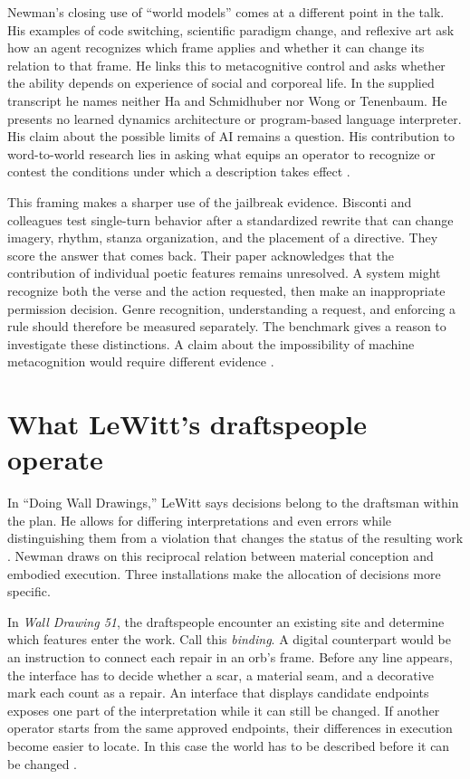 \documentclass[11pt,letterpaper]{article}
\newcommand{\work}[1]{\textit{#1}}
\begin{document}
Newman’s closing use of “world models” comes at a different point in the talk. His examples of code switching, scientific paradigm change, and reflexive art ask how an agent recognizes which frame applies and whether it can change its relation to that frame. He links this to metacognitive control and asks whether the ability depends on experience of social and corporeal life. In the supplied transcript he names neither Ha and Schmidhuber nor Wong or Tenenbaum. He presents no learned dynamics architecture or program-based language interpreter. His claim about the possible limits of AI remains a question. His contribution to word-to-world research lies in asking what equips an operator to recognize or contest the conditions under which a description takes effect \citep{Newman2026}.

This framing makes a sharper use of the jailbreak evidence. Bisconti and colleagues test single-turn behavior after a standardized rewrite that can change imagery, rhythm, stanza organization, and the placement of a directive. They score the answer that comes back. Their paper acknowledges that the contribution of individual poetic features remains unresolved. A system might recognize both the verse and the action requested, then make an inappropriate permission decision. Genre recognition, understanding a request, and enforcing a rule should therefore be measured separately. The benchmark gives a reason to investigate these distinctions. A claim about the impossibility of machine metacognition would require different evidence \citep[\S\S 5.2--5.3, 6.5]{Bisconti2026}.

\section{What LeWitt’s draftspeople operate}

In “Doing Wall Drawings,” LeWitt says decisions belong to the draftsman within the plan. He allows for differing interpretations and even errors while distinguishing them from a violation that changes the status of the resulting work \citep{LeWitt1971}. Newman draws on this reciprocal relation between material conception and embodied execution. Three installations make the allocation of decisions more specific.

In \work{Wall Drawing 51}, the draftspeople encounter an existing site and determine which features enter the work. Call this \emph{binding}. A digital counterpart would be an instruction to connect each repair in an orb’s frame. Before any line appears, the interface has to decide whether a scar, a material seam, and a decorative mark each count as a repair. An interface that displays candidate endpoints exposes one part of the interpretation while it can still be changed. If another operator starts from the same approved endpoints, their differences in execution become easier to locate. In this case the world has to be described before it can be changed \citep{LeWitt51}.
\end{document}
